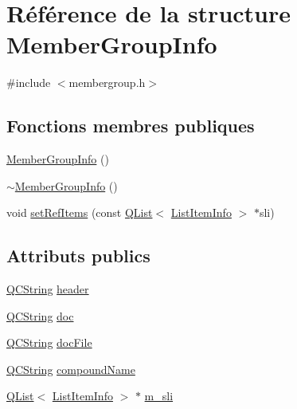 \hypertarget{struct_member_group_info}{}\section{Référence de la structure Member\+Group\+Info}
\label{struct_member_group_info}


{\ttfamily \#include $<$membergroup.\+h$>$}

\subsection*{Fonctions membres publiques}
\begin{DoxyCompactItemize}
\item 
\hyperlink{struct_member_group_info_af99afc0278dd0a62ff1f0a3b61b9c1b8}{Member\+Group\+Info} ()
\item 
\hyperlink{struct_member_group_info_acc32bb9afded667e4df16c5c91692f66}{$\sim$\+Member\+Group\+Info} ()
\item 
void \hyperlink{struct_member_group_info_a4e4a2794cd25b882ccacbcb4a7a127db}{set\+Ref\+Items} (const \hyperlink{class_q_list}{Q\+List}$<$ \hyperlink{struct_list_item_info}{List\+Item\+Info} $>$ $\ast$sli)
\end{DoxyCompactItemize}
\subsection*{Attributs publics}
\begin{DoxyCompactItemize}
\item 
\hyperlink{class_q_c_string}{Q\+C\+String} \hyperlink{struct_member_group_info_ae9064c66b617952b9c0f924ef30ce226}{header}
\item 
\hyperlink{class_q_c_string}{Q\+C\+String} \hyperlink{struct_member_group_info_a263221a15d1c749d14edc584881a27b3}{doc}
\item 
\hyperlink{class_q_c_string}{Q\+C\+String} \hyperlink{struct_member_group_info_ac6b12091c7246d55a69990307d9038e9}{doc\+File}
\item 
\hyperlink{class_q_c_string}{Q\+C\+String} \hyperlink{struct_member_group_info_a652f192bb091e84a9f5405ec5e20f49b}{compound\+Name}
\item 
\hyperlink{class_q_list}{Q\+List}$<$ \hyperlink{struct_list_item_info}{List\+Item\+Info} $>$ $\ast$ \hyperlink{struct_member_group_info_ab8d0845ef9ecaa1d3d09374098316fca}{m\+\_\+sli}
\end{DoxyCompactItemize}


